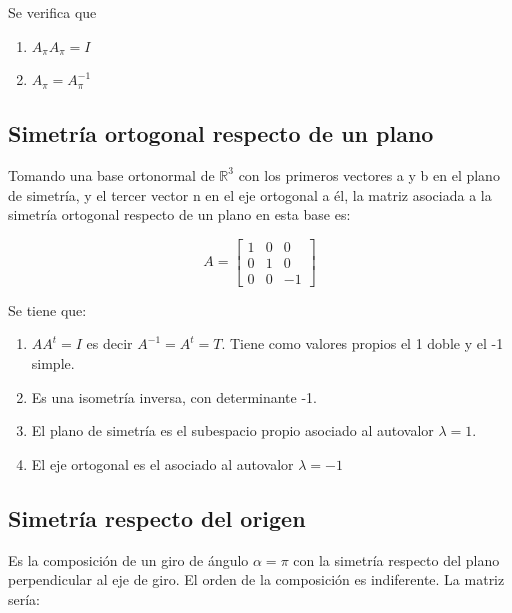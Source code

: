 \documentclass[10pt,a4paper]{article}
\theoremstyle{mystyle}
\begin{document}
Se verifica que 

\begin{enumerate}
	\item
	$ A_\pi A_\pi = I $
	\item
	$ A_\pi = A_{\pi}^{-1} $
		
\end{enumerate}

\subsection{Simetría ortogonal respecto de un plano}

Tomando una base ortonormal de $\mathbb{R}^3$ con los primeros vectores a y b en el plano de simetría, y el tercer vector n en el eje ortogonal a él, la matriz asociada a la simetría ortogonal respecto de un plano en esta base es:

\[
A=
\begin{bmatrix}
1 & 0 & 0 \\
0 &  1  & 0 \\
0 & 0 & -1
\end{bmatrix}
\]

Se tiene que:

\begin{enumerate}
\item $AA^{t} = I$ es decir $A^{-1} = A^{t} = T$. Tiene como valores propios el 1 doble y el -1 simple.
\item Es una isometría inversa, con determinante -1.
\item El plano de simetría es el subespacio propio asociado al autovalor $\lambda = 1$.
\item El eje ortogonal es el asociado al autovalor $\lambda = -1$
\end{enumerate}

\subsection{Simetría respecto del origen}
Es la composición de un giro de ángulo $\alpha = \pi$ con la simetría respecto del plano perpendicular al eje de giro. El orden de la composición es indiferente.
La matriz sería:
\end{document}
